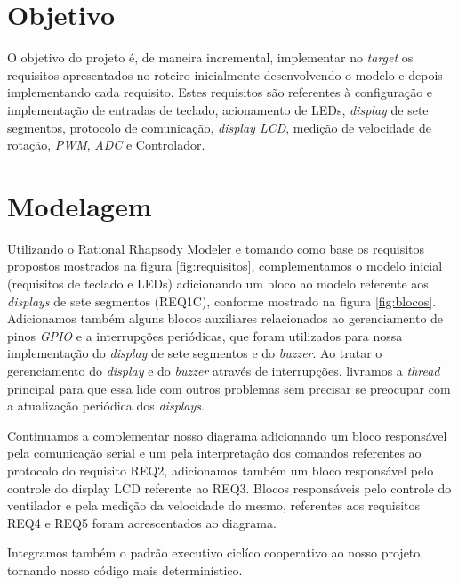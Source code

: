 \documentclass{article}
\begin{document}


\onehalfspacing
\section{Objetivo} 
O objetivo do projeto é, de maneira incremental, implementar no \textit{target} os requisitos apresentados no roteiro\cite{bb:roteiro} inicialmente desenvolvendo o modelo e depois implementando cada requisito. Estes requisitos são referentes à configuração e implementação de entradas de teclado, acionamento de LEDs, \textit{display} de sete segmentos, protocolo de comunicação, \textit{display LCD}, medição de velocidade de rotação, \textit{PWM}, \textit{ADC} e Controlador. 
	
\section{Modelagem}
Utilizando o Rational Rhapsody Modeler e tomando como base os requisitos propostos mostrados na figura \ref{fig:requisitos}, complementamos o modelo inicial\cite{bb:modelo} (requisitos de teclado e LEDs) adicionando um bloco ao modelo referente aos \textit{displays} de sete segmentos (REQ1C), conforme mostrado na figura \ref{fig:blocos}. Adicionamos também alguns blocos auxiliares relacionados ao gerenciamento de pinos \textit{GPIO} e a interrupções periódicas, que foram utilizados para nossa implementação do \textit{display} de sete segmentos e do \textit{buzzer}. Ao tratar o gerenciamento do \textit{display} e do \textit{buzzer} através de interrupções, livramos a \textit{thread} principal para que essa lide com outros problemas sem precisar se preocupar com a atualização periódica dos \textit{displays}.

Continuamos a complementar nosso diagrama adicionando um bloco responsável pela comunicação serial e um pela interpretação dos comandos referentes ao protocolo do requisito REQ2, adicionamos também um bloco responsável pelo controle do display LCD referente ao REQ3. Blocos responsáveis pelo controle do ventilador e pela medição da velocidade do mesmo, referentes aos requisitos REQ4 e REQ5 foram acrescentados ao diagrama.

Integramos também o padrão executivo ciclíco cooperativo ao nosso projeto, tornando nosso código mais determinístico.
\end{document}

